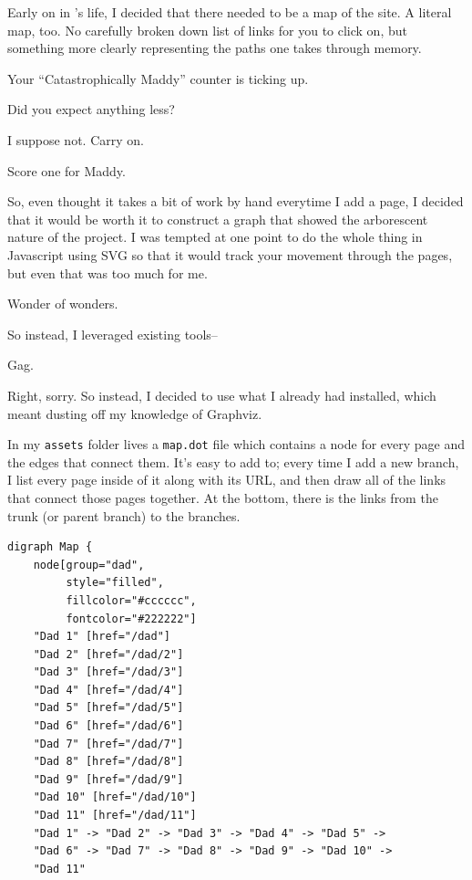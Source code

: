 \begin{paracol}{2}
\begin{leftcolumn}
\noindent Early on in \allyId's life, I decided that there needed to be a map of the site. A literal map, too. No carefully broken down list of links for you to click on, but something more clearly representing the paths one takes through memory.

\begin{ally}
  Your ``Catastrophically Maddy'' counter is ticking up.
\end{ally}
Did you expect anything less?

\begin{ally}
  I suppose not. Carry on.
\end{ally}
Score one for Maddy.

So, even thought it takes a bit of work by hand everytime I add a page, I decided that it would be worth it to construct a graph that showed the arborescent nature of the project. I was tempted at one point to do the whole thing in Javascript using SVG so that it would track your movement through the pages, but even that was too much for me.

\begin{ally}
  Wonder of wonders.
\end{ally}
So instead, I leveraged existing tools--

\begin{ally}
  Gag.
\end{ally}
Right, sorry. So instead, I decided to use what I already had installed, which meant dusting off my knowledge of Graphviz.

In my \texttt{assets} folder lives a \texttt{map.dot} file which contains a node for every page and the edges that connect them. It's easy to add to; every time I add a new branch, I list every page inside of it along with its URL, and then draw all of the links that connect those pages together. At the bottom, there is the links from the trunk (or parent branch) to the branches.

\begin{verbatim}
digraph Map {
    node[group="dad",
         style="filled",
         fillcolor="#cccccc",
         fontcolor="#222222"]
    "Dad 1" [href="/dad"]
    "Dad 2" [href="/dad/2"]
    "Dad 3" [href="/dad/3"]
    "Dad 4" [href="/dad/4"]
    "Dad 5" [href="/dad/5"]
    "Dad 6" [href="/dad/6"]
    "Dad 7" [href="/dad/7"]
    "Dad 8" [href="/dad/8"]
    "Dad 9" [href="/dad/9"]
    "Dad 10" [href="/dad/10"]
    "Dad 11" [href="/dad/11"]
    "Dad 1" -> "Dad 2" -> "Dad 3" -> "Dad 4" -> "Dad 5" ->
    "Dad 6" -> "Dad 7" -> "Dad 8" -> "Dad 9" -> "Dad 10" ->
    "Dad 11"
\end{verbatim}


\end{leftcolumn}
\end{paracol}
